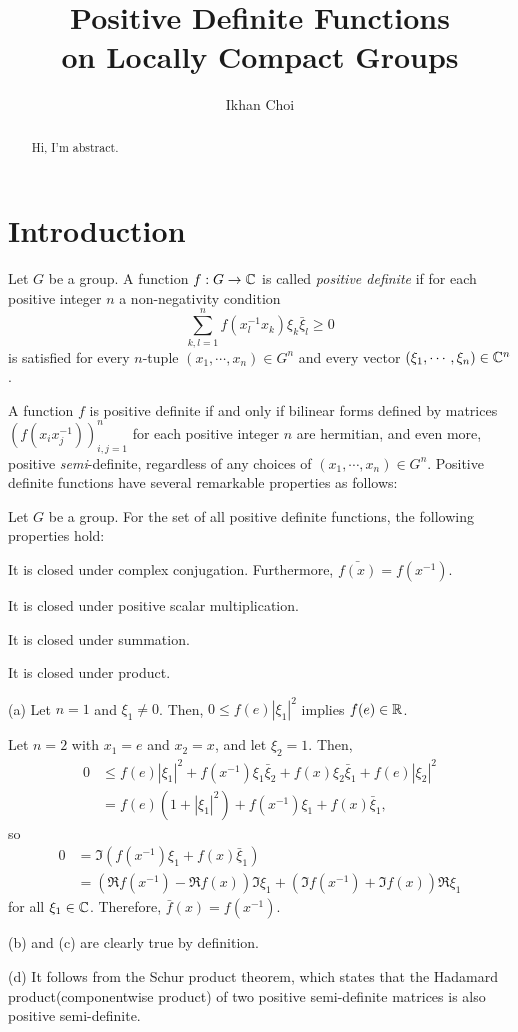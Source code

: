 \documentclass[12pt]{article}
\title{Positive Definite Functions\\on Locally Compact Groups}
\author{Ikhan Choi}
\begin{document}
\maketitle
\tableofcontents

\begin{abstract}
Hi, I'm abstract.
\end{abstract}

\section{Introduction}


\begin{defn}
Let $G$ be a group.
A function $f:G\to\mathbb{C}$ is called \emph{positive definite} if for each positive integer $n$ a non-negativity condition
\[\sum_{k,l=1}^nf(x_l^{-1}x_k)\xi_k\bar\xi_l\ge0\]
is satisfied for every $n$-tuple $(x_1,\cdots,x_n)\in G^n$ and every vector $(\xi_1,\cdots,\xi_n)\in\mathbb{C}^n$.
\end{defn}
A function $f$ is positive definite if and only if bilinear forms defined by matrices $(f(x_ix_j^{-1}))_{i,j=1}^n$ for each positive integer $n$ are hermitian, and even more, positive \emph{semi}-definite, regardless of any choices of $(x_1,\cdots,x_n)\in G^n$.
Positive definite functions have several remarkable properties as follows:
\begin{prop}
Let $G$ be a group.
For the set of all positive definite functions, the following properties hold:
\begin{parts}
\item It is closed under complex conjugation. Furthermore, $\bar{f(x)}=f(x^{-1})$.
\item It is closed under positive scalar multiplication.
\item It is closed under summation.
\item It is closed under product.
\end{parts}
\end{prop}
\begin{pf}
(a)
Let $n=1$ and $\xi_1\ne0$.
Then, $0\le f(e)|\xi_1|^2$ implies $f(e)\in\mathbb{R}$.

Let $n=2$ with $x_1=e$ and $x_2=x$, and let $\xi_2=1$.
Then,
\begin{align*}
0&\le f(e)|\xi_1|^2+f(x^{-1})\xi_1\bar\xi_2+f(x)\xi_2\bar\xi_1+f(e)|\xi_2|^2\\
&=f(e)(1+|\xi_1|^2)+f(x^{-1})\xi_1+f(x)\bar\xi_1,
\end{align*}
so
\begin{align*}
0&=\Im(f(x^{-1})\xi_1+f(x)\bar\xi_1)\\
&=(\Re f(x^{-1})-\Re f(x))\Im\xi_1+(\Im f(x^{-1})+\Im f(x))\Re\xi_1
\end{align*}
for all $\xi_1\in\mathbb{C}$.
Therefore, $\bar f(x)=f(x^{-1})$.

(b) and (c) are clearly true by definition.

(d) It follows from the Schur product theorem, which states that the Hadamard product(componentwise product) of two positive semi-definite matrices is also positive semi-definite.
\end{pf}
\end{document}
